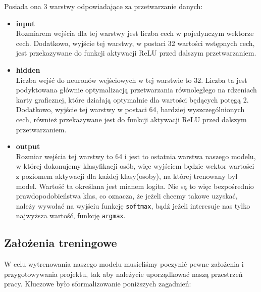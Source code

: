 Posiada ona 3 warstwy odpowiadające za przetwarzanie danych:
\begin{itemize}
    \item \textbf{input}
    \\ Rozmiarem wejścia dla tej warstwy jest liczba cech w pojedynczym wektorze cech.
    Dodatkowo, wyjście tej warstwy, w postaci 32 wartości wstępnych cech, jest przekazywane do funkcji aktywacji ReLU przed
    dalszym przetwarzaniem.
    \item \textbf{hidden}
    \\ Liczba wejść do neuronów wejściowych w tej warstwie to 32. Liczba ta jest podyktowana
    głównie optymalizacją przetwarzania równoległego na rdzeniach karty graficznej, które
    działają optymalnie dla wartości będących potęgą 2.
    Dodatkowo, wyjście tej warstwy w postaci 64, bardziej wyszczególnionych cech,
    również przekazywane jest do funkcji aktywacji ReLU przed dalszym przetwarzaniem.
    \item \textbf{output}
    \\ Rozmiar wejścia tej warstwy to 64 i jest to ostatnia warstwa naszego modelu, w której
    dokonujemy klasyfikacji osób, więc wyjściem będzie wektor wartości z poziomem aktywacji dla
    każdej klasy(osoby), na której trenowany był model. Wartość ta określana jest mianem logita.
    Nie są to więc bezpośrednio prawdopodobieństwa klas, co oznacza, że jeżeli chcemy takowe
    uzyskać, należy wywołać na wyjściu funkcję \texttt{softmax}, bądź jeżeli interesuje nas tylko
    najwyższa wartość, funkcję \texttt{argmax}.
\end{itemize}

\subsection{Założenia treningowe}
W celu wytrenowania naszego modelu musieliśmy poczynić pewne założenia i przygotowywania
projektu, tak aby należycie uporządkować naszą przestrzeń pracy. Kluczowe było sformalizowanie
poniższych zagadnień:
